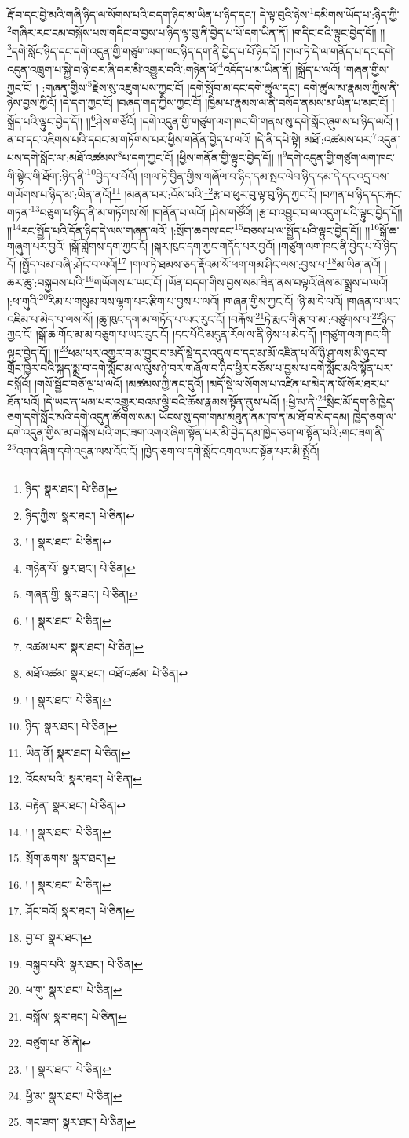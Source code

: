 རྡོ་བ་དང་བྱེ་མའི་གཞི་ཉིད་ལ་སོགས་པའི་བདག་ཉིད་མ་ཡིན་པ་ཉིད་དང་། དེ་ལྟ་བུའི་ཉེས་\footnote{ཉིད་  སྣར་ཐང་།  པེ་ཅིན། }དམིགས་ཡོད་པ་:ཉིད་ཀྱི་\footnote{ཉིད་ཀྱིས་  སྣར་ཐང་།  པེ་ཅིན། }གཞིར་རང་ངམ་བསྐོས་པས་གདིང་བ་བྱས་པ་ཉིད་ལྟ་བུ་ནི་བྱེད་པ་པོ་དག་ཡིན་ནོ། །གདིང་བའི་ལྟུང་བྱེད་དོ།། །།\footnote{། །  སྣར་ཐང་།  པེ་ཅིན། }དགེ་སློང་ཉིད་དང་དགེ་འདུན་གྱི་གཙུག་ལག་ཁང་ཉིད་དག་ནི་བྱེད་པ་པོ་ཉིད་དོ། །གལ་ཏེ་དེ་ལ་གནོད་པ་དང་དགེ་འདུན་འཁྲུག་པ་སྐྱེ་བ་ཉེ་བར་ཞི་བར་མི་འགྱུར་བའི་:གཉེན་ཕོ་\footnote{གཉེན་པོ་  སྣར་ཐང་།  པེ་ཅིན། }འདོད་པ་མ་ཡིན་ནོ། །སྐྲོད་པ་ལའོ། །གཞན་གྱིས་ཀྱང་ངོ། །
:གཞན་གྱིས་\footnote{གཞན་གྱི་  སྣར་ཐང་།  པེ་ཅིན། }རྗེས་སུ་འཇུག་པས་ཀྱང་ངོ། །དགེ་སློབ་མ་དང་དགེ་ཚུལ་དང་། དགེ་ཚུལ་མ་རྣམས་ཀྱིས་ནི་ཉེས་བྱས་ཀྱིའོ། །དེ་དག་ཀྱང་ངོ། །བཞད་གད་ཀྱིས་ཀྱང་ངོ། །ཁྱིམ་པ་རྣམས་ལ་ནི་བསོད་ནམས་མ་ཡིན་པ་མང་ངོ། །སྐྲོད་པའི་ལྟུང་བྱེད་དོ།། །།\footnote{། །  སྣར་ཐང་།  པེ་ཅིན། }ཤེས་གཙོའོ། །དགེ་འདུན་གྱི་གཙུག་ལག་ཁང་གི་གནས་སུ་དགེ་སློང་ཞུགས་པ་ཉིད་ལའོ། །ན་བ་དང་འཇིགས་པའི་དབང་མ་གཏོགས་པར་ཕྱིས་གནོན་བྱེད་པ་ལའོ། །དེ་ནི་དཔེ་སྟེ། མཐོ་:འཚམས་པར་\footnote{འཚམ་པར་  སྣར་ཐང་།  པེ་ཅིན། }འདུན་པས་དགེ་སློང་ལ་:མཐོ་འཚམས་\footnote{མཐོ་འཚམ་  སྣར་ཐང་། འཐོ་འཚམ་  པེ་ཅིན། }པ་དག་ཀྱང་ངོ། །ཕྱིས་གནོན་གྱི་ལྟུང་བྱེད་དོ།། །།\footnote{། །  སྣར་ཐང་།  པེ་ཅིན། }དགེ་འདུན་གྱི་གཙུག་ལག་ཁང་གི་སྟེང་གི་ཐོག་:ཉིད་ནི་\footnote{ཉིད་  སྣར་ཐང་།  པེ་ཅིན། }བྱེད་པ་པོའོ། །གལ་ཏེ་བྱིན་གྱིས་གཞོལ་བ་ཉིད་དམ་སྤང་ལེབ་ཉིད་དམ་དེ་དང་འདྲ་བས་གཡོགས་པ་ཉིད་མ་:ཡིན་ནའོ།\footnote{ཡིན་ནོ།  སྣར་ཐང་།  པེ་ཅིན། } །མནན་པར་:འོས་པའི་\footnote{འོངས་པའི་  སྣར་ཐང་།  པེ་ཅིན། }རྩ་བ་ཕུར་བུ་ལྟ་བུ་ཉིད་ཀྱང་ངོ། །བཀན་པ་ཉིད་དང་རྐང་གཏན་\footnote{བརྟེན་  སྣར་ཐང་།  པེ་ཅིན། }བཅུག་པ་ཉིད་ནི་མ་གཏོགས་སོ། །གནོན་པ་ལའོ། །ཤེས་གཙོའོ། །རྩ་བ་འབྱུང་བ་ལ་འདུག་པའི་ལྟུང་བྱེད་དོ།། །།\footnote{། །  སྣར་ཐང་།  པེ་ཅིན། }རང་སྤྱོད་པའི་དོན་ཉིད་དེ་ལས་གཞན་ལའོ། །:སྲོག་ཆགས་དང་\footnote{སྲོག་ཆགས་  སྣར་ཐང་། }བཅས་པ་ལ་སྤྱོད་པའི་ལྟུང་བྱེད་དོ།། །།\footnote{། །  སྣར་ཐང་།  པེ་ཅིན། }སྒོ་ཆ་གཞུག་པར་བྱའོ། །སྒོ་གླེགས་དག་ཀྱང་ངོ། །སྐར་ཁུང་དག་ཀྱང་གདོད་པར་བྱའོ། །གཙུག་ལག་ཁང་ནི་བྱེད་པ་པོ་ཉིད་དོ། །སྤྱོད་ལམ་བཞི་:ཤོང་བ་ལའོ།\footnote{ཤོང་བའོ།  སྣར་ཐང་།  པེ་ཅིན། } །གལ་ཏེ་ཐམས་ཅད་རྡོའམ་སོ་ཕག་གམ་ཤིང་ལས་:བྱས་པ་\footnote{བྱ་བ་  སྣར་ཐང་། }མ་ཡིན་ནའོ། །ཆར་ཆུ་:བསྐྱབས་པའི་\footnote{བསྐྱབ་པའི་  སྣར་ཐང་།  པེ་ཅིན། }གཡོགས་པ་ཡང་ངོ། །ཡོན་བདག་གིས་བྱས་སམ་ཟིན་ནས་བལྟའོ་ཞེས་མ་སྨྲས་པ་ལའོ། །:ཕ་གུའི་\footnote{ཕ་གུ་  སྣར་ཐང་།  པེ་ཅིན། }རིམ་པ་གསུམ་ལས་ལྷག་པར་རྩིག་པ་བྱས་པ་ལའོ། །གཞན་གྱིས་ཀྱང་ངོ། །ཉི་མ་དེ་ལའོ། །གཞན་ལ་ཡང་འཇིམ་པ་མེད་པ་ལས་སོ། །ཆུ་ཁུང་དག་མ་གཏོད་པ་ཡང་རུང་ངོ། །བརྐོས་\footnote{བསྐོས་  སྣར་ཐང་།  པེ་ཅིན། }ཏེ་རྨང་གི་རྩ་བ་མ་:བཙུགས་པ་\footnote{བཙུག་པ་  ཅོ་ནེ། }ཉིད་ཀྱང་ངོ། །སྒོ་ཆ་གོང་མ་མ་བཅུག་པ་ཡང་རུང་ངོ། །དང་པོའི་མདུན་རོལ་ལ་ནི་ཉེས་པ་མེད་དོ། །གཙུག་ལག་ཁང་གི་ལྟུང་བྱེད་དོ།། །།\footnote{། །  སྣར་ཐང་།  པེ་ཅིན། }ཕམ་པར་འགྱུར་བ་མ་བྱུང་བ་མདོ་སྡེ་དང་འདུལ་བ་དང་མ་མོ་འཛིན་པ་ལོ་ཉི་ཤུ་ལས་མི་ཉུང་བ་གྲོང་ཁྱེར་བའི་སྐད་སྨྲ་བ་དགེ་སློང་མ་ལ་ལུས་ཉེ་བར་གཞོལ་བ་ཉིད་ཕྱིར་བཅོས་པ་བྱས་པ་དགེ་སློང་མའི་སྟོན་པར་བསྐོའོ། །གསོ་སྦྱོང་བཅོ་ལྔ་པ་ལའོ། །མཚམས་ཀྱི་ནང་དུའོ། །མདོ་སྡེ་ལ་སོགས་པ་འཛིན་པ་མེད་ན་སོ་སོར་ཐར་པ་ཐོན་པའོ། །དེ་ཡང་ན་ཕམ་པར་འགྱུར་བའམ་ལྕི་བའི་ཆོས་རྣམས་སྟོན་ནུས་པའོ། །:ཕྱི་མ་ནི་\footnote{ཕྱི་མ་  སྣར་ཐང་།  པེ་ཅིན། }སྲིང་མོ་དག་ཅི་ཁྱེད་ཅག་དགེ་སློང་མའི་དགེ་འདུན་ཚོགས་སམ། ཡོངས་སུ་དག་གམ་མཐུན་ནམ་ཁ་ན་མ་ཐོ་བ་མེད་དམ། ཁྱེད་ཅག་ལ་དགེ་འདུན་གྱིས་མ་བསྐོས་པའི་གང་ཟག་འགའ་ཞིག་སྟོན་པར་མི་བྱེད་དམ་ཁྱེད་ཅག་ལ་སྟོན་པའི་:གང་ཟག་ནི་\footnote{གང་ཟག་  སྣར་ཐང་།  པེ་ཅིན། }འགའ་ཞིག་དགེ་འདུན་ལས་འོང་ངོ། །ཁྱེད་ཅག་ལ་དགེ་སློང་འགའ་ཡང་སྟོན་པར་མི་སྤྲོའོ། 